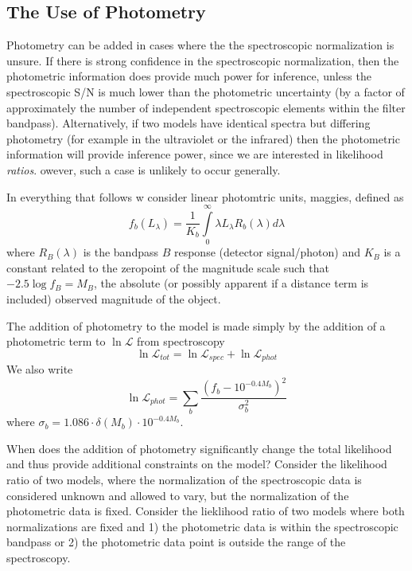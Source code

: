 \documentclass{emulateapj}
\begin{document}
\subsection{The Use of Photometry}
Photometry can be added in cases where the the spectroscopic normalization is unsure.  If there is strong confidence in the spectroscopic normalization, then the photometric information does provide much power for inference, unless the spectroscopic S/N is much lower than the photometric uncertainty (by a factor of approximately the number of independent spectroscopic elements within the filter bandpass).  Alternatively, if two models have identical spectra but differing photometry (for example in the ultraviolet or the infrared) then the photometric information will provide inference power, since we are interested in likelihood \emph{ratios}.  owever, such a case is unlikely to occur generally.

In everything that follows w consider linear photomtric units, maggies, defined as 
\begin{equation}
f_b(L_\lambda) = \frac{1}{K_b}\int\limits_0^\infty \lambda L_\lambda R_b(\lambda) d\lambda
\end{equation}
where $R_B(\lambda)$ is the bandpass $B$ response (detector signal/photon) and $K_B$ is a constant related to the zeropoint of the magnitude scale such that $-2.5 \log f_B = M_B$, the absolute (or possibly apparent if a distance term is included) observed magnitude of the object.

The addition of photometry to the model is made simply by the addition of a photometric term to $\ln \mathcal{L}$ from spectroscopy
\begin{equation}
\ln \mathcal{L} _{tot} = \ln \mathcal{L}_{spec} + \ln\mathcal{L}_{phot}
\end{equation}
We also write 
\begin{equation}
\ln \mathcal{L} _{phot} = \sum\limits_b \frac{(f_b - 10^{-0.4M_b})^2}{\sigma_b^2}
\end{equation}
where $\sigma_b = 1.086\cdot\delta(M_b)\cdot 10^{-0.4M_b}$.

When does the addition of photometry significantly change the total likelihood and thus provide additional constraints on the model?  Consider the likelihood ratio of two models, where the normalization of the spectroscopic data is considered unknown and allowed to vary, but the normalization of the photometric data is fixed.  Consider the lieklihood ratio of two models where both normalizations are fixed and 1) the photometric data is within the spectroscopic bandpass or 2) the photometric data point is outside the range of the spectroscopy. 
\end{document}
